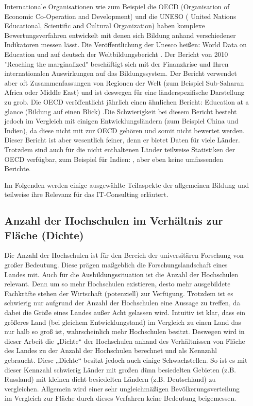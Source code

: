 Internationale Organisationen wie zum Beispiel die OECD (Organisation of Economic Co-Operation and Development) und die UNESO ( United Nations Educational, Scientific and Cultural Organization) haben komplexe Bewertungsverfahren entwickelt mit denen sich Bildung anhand verschiedener Indikatoren messen lässt.
Die Veröffentlichung der Unesco heißen: World Data on Education \cite{unesco2} und auf deutsch der Weltbildungsbericht \cite{unesco1}. Der Bericht von 2010 "Reaching the marginalized" beschäftigt sich mit der Finanzkrise und Ihren internationalen Auswirkungen auf das Bildungssystem. Der Bericht verwendet aber oft Zusammenfassungen von Regionen der Welt (zum Beispiel Sub-Saharan Africa oder Middle East) und ist deswegen für eine länderspezifische Darstellung zu grob. 
Die OECD veröffentlicht jährlich einen ähnlichen Bericht: Education at a glance (Bildung auf einen Blick) \cite{oecd5} .Die Schwierigkeit bei diesem Bericht  besteht jedoch im Vergleich mit einigen Entwicklungsländern (zum Beispiel China und Indien), da diese nicht mit zur OECD gehören und somit nicht bewertet werden. Dieser Bericht ist aber wesentlich feiner, denn er bietet Daten für viele Länder. Trotzdem sind auch für die nicht enthaltenen Länder teilweise Statistiken der OECD verfügbar, zum Beispiel für Indien: \cite{oecd}, aber eben keine umfassenden Berichte.

Im Folgenden werden einige ausgewählte Teilaspekte der allgemeinen Bildung und teilweise ihre Relevanz für das IT-Consulting erläutert.

\subsection*{Anzahl der Hochschulen im Verhältnis zur Fläche (Dichte)}
Die Anzahl der Hochschulen ist für den Bereich der universitären Forschung von großer Bedeutung. Diese prägen maßgeblich die Forschungslandschaft eines Landes mit. Auch für die Ausbildungssituation ist die Anzahl der Hochschulen relevant. Denn um so mehr Hochschulen existieren, desto mehr ausgebildete Fachkräfte stehen der Wirtschaft (potenziell) zur Verfügung. 
Trotzdem ist es schwierig nur aufgrund der Anzahl der Hochschulen eine Aussage zu treffen, da dabei die Größe eines Landes außer Acht gelassen wird. Intuitiv ist klar, dass ein größeres Land (bei gleichem Entwicklungstand) im Vergleich zu einen Land das nur halb so groß ist, wahrscheinlich mehr Hochschulen besitzt. Deswegen wird in dieser Arbeit die „Dichte“ der Hochschulen anhand des Verhältnissen von  Fläche des Landes zu der Anzahl der Hochschulen berechnet und als Kennzahl gebraucht.
Diese „Dichte“ besitzt jedoch auch einige Schwachstellen. So ist es mit dieser Kennzahl schwierig Länder mit großen dünn besiedelten Gebieten (z.B. Russland) mit kleinen dicht besiedelten Ländern (z.B. Deutschland) zu vergleichen. Allgemein wird einer sehr ungleichmäßigen Bevölkerungsverteilung im Vergleich zur Fläche durch dieses Verfahren keine Bedeutung beigemessen.

